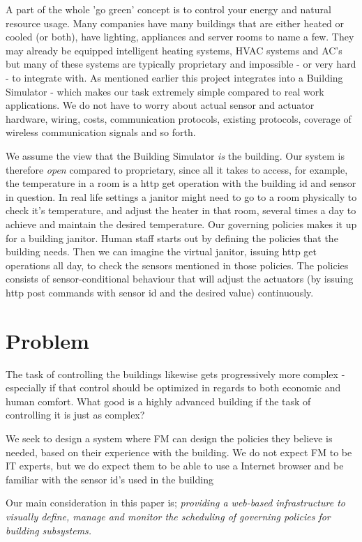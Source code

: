 A part of the whole 'go green' concept is to control your energy and natural resource usage. Many companies have many buildings that are either heated or cooled (or both), have lighting, appliances and server rooms to name a few. They may already be equipped intelligent heating systems, HVAC systems and AC's but many of these systems are typically proprietary and impossible - or very hard - to integrate with. As mentioned earlier this project integrates into a Building Simulator - which makes our task extremely simple compared to real work applications. We do not have to worry about actual sensor and actuator hardware, wiring, costs, communication protocols, existing protocols, coverage of wireless communication signals and so forth.

We assume the view that the Building Simulator \textit{is} the building. Our system is therefore \textit{open} compared to proprietary, since all it takes to access, for example, the temperature in a room is a http get operation with the building id and sensor in question. In real life settings a janitor might need to go to a room physically to check it's temperature, and adjust the heater in that room, several times a day to achieve and maintain the desired temperature. Our governing policies makes it up for a building janitor. Human staff starts out by defining the policies that the building needs. Then we can imagine the virtual janitor, issuing http get operations all day, to check the sensors mentioned in those policies. The policies consists of sensor-conditional behaviour that will adjust the actuators (by issuing http post commands with sensor id and the desired value) continuously.

\section{Problem} \label{sec:problem}
The task of controlling the buildings likewise gets progressively more complex - especially if that control should be optimized in regards to both economic and human comfort. What good is a highly advanced building if the task of controlling it is just as complex?

We seek to design a system where FM can design the policies they believe is needed, based on their experience with the building. We do not expect FM to be IT experts, but we do expect them to be able to use a Internet browser and be familiar with the sensor id's used in the building

Our main consideration in this paper is; \textit{providing a web-based infrastructure to visually define, manage and monitor the scheduling of governing policies for building subsystems.}

